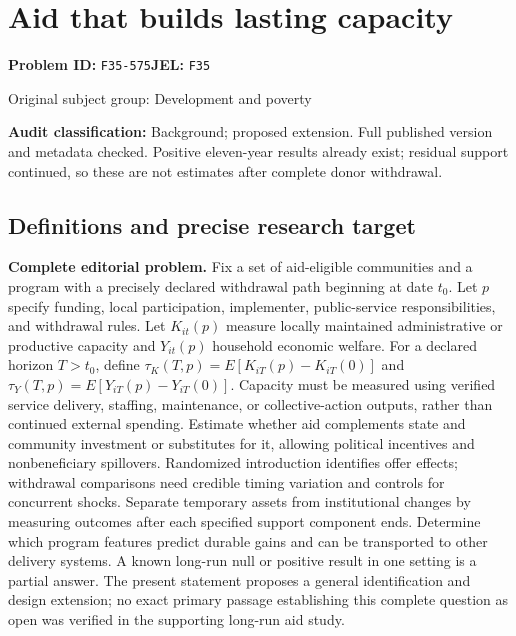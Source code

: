 \documentclass[11pt,a4paper]{article}
\begin{document}
\section*{Aid that builds lasting capacity}
\textbf{Problem ID:} \texttt{F35-575}\quad \textbf{JEL:} \texttt{F35}\par
\label{problem:OP-0375}
{\sffamily\small\color{muted}Original subject group: Development and poverty\par}
\label{definitions:problem:30007657}
\textbf{Audit classification:} Background; proposed extension. Full published version and metadata checked. Positive eleven-year results already exist; residual support continued, so these are not estimates after complete donor withdrawal.
\subsection*{Definitions and precise research target}
\textbf{Complete editorial problem.} Fix a set of aid-eligible communities and a program with a precisely declared withdrawal path beginning at date \(t_0\). Let \(p\) specify funding, local participation, implementer, public-service responsibilities, and withdrawal rules. Let \(K_{it}(p)\) measure locally maintained administrative or productive capacity and \(Y_{it}(p)\) household economic welfare. For a declared horizon \(T>t_0\), define \(\tau_K(T,p)=E[K_{iT}(p)-K_{iT}(0)]\) and \(\tau_Y(T,p)=E[Y_{iT}(p)-Y_{iT}(0)]\). Capacity must be measured using verified service delivery, staffing, maintenance, or collective-action outputs, rather than continued external spending. Estimate whether aid complements state and community investment or substitutes for it, allowing political incentives and nonbeneficiary spillovers. Randomized introduction identifies offer effects; withdrawal comparisons need credible timing variation and controls for concurrent shocks. Separate temporary assets from institutional changes by measuring outcomes after each specified support component ends. Determine which program features predict durable gains and can be transported to other delivery systems. A known long-run null or positive result in one setting is a partial answer. The present statement proposes a general identification and design extension; no exact primary passage establishing this complete question as open was verified in the supporting long-run aid study.
\end{document}
